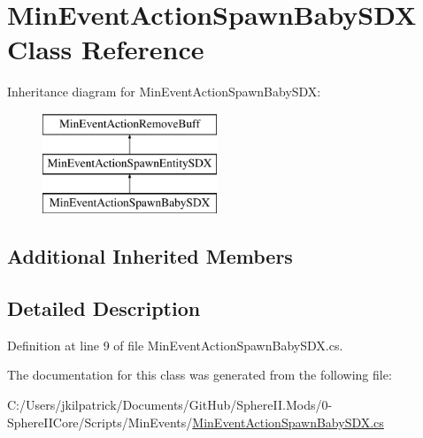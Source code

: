 \hypertarget{class_min_event_action_spawn_baby_s_d_x}{}\section{Min\+Event\+Action\+Spawn\+Baby\+S\+DX Class Reference}
\label{class_min_event_action_spawn_baby_s_d_x}
Inheritance diagram for Min\+Event\+Action\+Spawn\+Baby\+S\+DX\+:\begin{figure}[H]
\begin{center}
\leavevmode
\includegraphics[height=3.000000cm]{d5/d08/class_min_event_action_spawn_baby_s_d_x}
\end{center}
\end{figure}
\subsection*{Additional Inherited Members}


\subsection{Detailed Description}


Definition at line 9 of file Min\+Event\+Action\+Spawn\+Baby\+S\+D\+X.\+cs.



The documentation for this class was generated from the following file\+:\begin{DoxyCompactItemize}
\item 
C\+:/\+Users/jkilpatrick/\+Documents/\+Git\+Hub/\+Sphere\+I\+I.\+Mods/0-\/\+Sphere\+I\+I\+Core/\+Scripts/\+Min\+Events/\mbox{\hyperlink{_min_event_action_spawn_baby_s_d_x_8cs}{Min\+Event\+Action\+Spawn\+Baby\+S\+D\+X.\+cs}}\end{DoxyCompactItemize}
